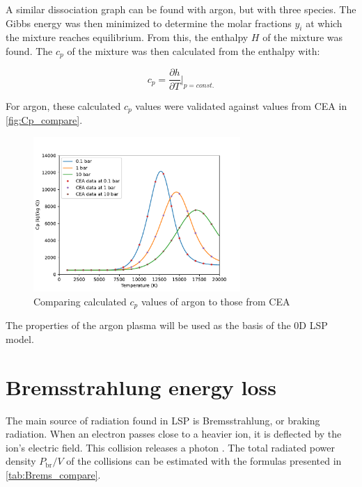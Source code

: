         A similar dissociation graph can be found with argon, but with three species. The Gibbs energy was then minimized to determine the molar fractions $y_i$ at which the mixture reaches equilibrium. From this, the enthalpy $H$ of the mixture was found. The $c_p$ of the mixture was then calculated from the enthalpy with:

        \begin{equation}
            c_p = \frac{\partial h}{\partial T}\bigg|_{p = const.}
        \end{equation}
        
        For argon, these calculated $c_p$ values were validated against values from CEA \cite{CEARUNRev42024} in \autoref{fig:Cp_compare}.
        
        \begin{figure}[!ht]
            \centering
            \includegraphics[width=0.7\textwidth]{assets/2 models/Cp_compare.pdf}
            \caption{Comparing calculated $c_p$ values of argon to those from CEA}
            \label{fig:Cp_compare}
        \end{figure}

        The properties of the argon plasma will be used as the basis of the 0D LSP model.
    
    \section{Bremsstrahlung energy loss}
        
        The main source of radiation found in LSP is Bremsstrahlung, or braking radiation. When an electron passes close to a heavier ion, it is deflected by the ion's electric field. This collision releases a photon \autocite{glasstoneControlledThermonuclearReactions1975}. The total radiated power density $P_\mathrm{br}/V$ of the collisions can be estimated with the formulas presented in \autoref{tab:Brems_compare}.

